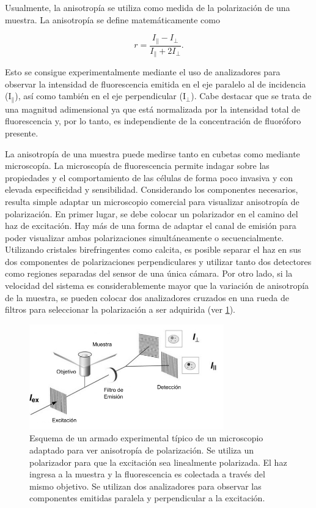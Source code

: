 Usualmente, la anisotropía se utiliza como medida de la polarización de una muestra. La anisotropía se define matemáticamente como

\begin{equation}
    r = \frac{I_{\parallel} - I_{\perp}}{I_{\parallel} + 2 I_{\perp}}.
\end{equation}

\noindent Esto se consigue experimentalmente mediante el uso de analizadores para observar la intensidad de fluorescencia emitida en el eje paralelo al de incidencia (I$_{\parallel}$), así como también en el eje perpendicular (I$_{\perp}$). Cabe destacar que se trata de una magnitud adimensional ya que está normalizada por la intensidad total de fluorescencia y, por lo tanto, es independiente de la concentración de fluoróforo presente.

La anisotropía de una muestra puede medirse tanto en cubetas como mediante microscopía. La microscopía de fluorescencia permite indagar sobre las propiedades y el comportamiento de las células de forma poco invasiva y con elevada especificidad y sensibilidad. Considerando los componentes necesarios, resulta simple adaptar un microscopio comercial para visualizar anisotropía de polarización. En primer lugar, se debe colocar un polarizador en el camino del haz de excitación. Hay más de una forma de adaptar el canal de emisión para poder visualizar ambas polarizaciones simultáneamente o secuencialmente. Utilizando cristales birefringentes como calcita, es posible separar el haz en sus dos componentes de polarizaciones perpendiculares y utilizar tanto dos detectores como regiones separadas del sensor de una única cámara. Por otro lado, si la velocidad del sistema es considerablemente mayor que la variación de anisotropía de la muestra, se pueden colocar dos analizadores cruzados en una rueda de filtros para seleccionar la polarización a ser adquirida (ver \cref{fig:esquemaAnisotropia}).

\begin{figure}
    \centering
    \includegraphics[width=0.75\textwidth]{img/cap_2/EsquemaAnisotropia.png}
    \caption{\footnotesize{Esquema de un armado experimental típico de un microscopio adaptado para ver anisotropía de polarización. Se utiliza un polarizador para que la excitación sea linealmente polarizada. El haz ingresa a la muestra y la fluorescencia es colectada a través del mismo objetivo. Se utilizan dos analizadores para observar las componentes emitidas paralela y perpendicular a la excitación.}}
    \label{fig:esquemaAnisotropia}
\end{figure}

